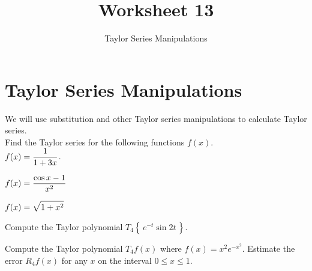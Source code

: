 \documentclass[paper=letter, 11pt]{article}
\title{Worksheet 13}
\subtitle{Taylor Series Manipulations}
\begin{document}
\maketitle

\section*{Taylor Series Manipulations}

We will use substitution and other Taylor series manipulations to calculate Taylor series.\\

\Prob Find the Taylor series for the following functions $f(x)$.\\

\subprob $\displaystyle f(x) = \frac{1}{1 + 3x}$.\vfill

\subprob $\displaystyle f(x) = \frac{\cos x - 1}{x^2}$\vfill

\subprob $\displaystyle f(x) = \sqrt{1 + x^2}$\vfill

\newpage

\Prob Compute the Taylor polynomial $T_4 \left\{\,e^{-t}\sin 2t\,\right\}$.\vfill

\Prob Compute the Taylor polynomial $T_4 f(x)$ where $f(x) = x^2 e^{-x^2}$.  Estimate the error $R_4 f(x)$ for any $x$ on the interval $0 \leq x \leq 1$.\vfill
\end{document}
